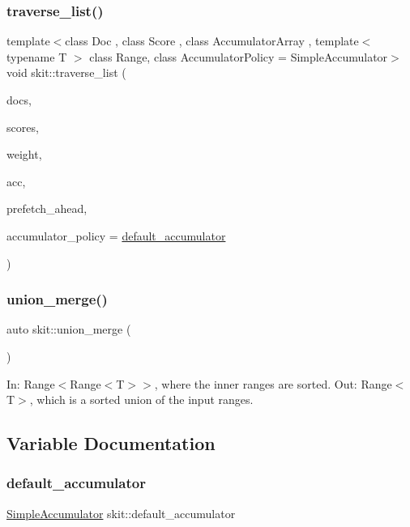 \mbox{\label{namespaceskit_aefabf6dd95494e20f6a58ad8b20e7bf9}} 
\subsubsection{\texorpdfstring{traverse\+\_\+list()}{traverse\_list()}\hspace{0.1cm}{\footnotesize\ttfamily [2/2]}}
{\footnotesize\ttfamily template$<$class Doc , class Score , class Accumulator\+Array , template$<$ typename T $>$ class Range, class Accumulator\+Policy  = Simple\+Accumulator$>$ \\
void skit\+::traverse\+\_\+list (\begin{DoxyParamCaption}\item[{const Range$<$ Doc $>$ \&}]{docs,  }\item[{const Range$<$ Score $>$ \&}]{scores,  }\item[{Score}]{weight,  }\item[{Accumulator\+Array \&}]{acc,  }\item[{unsigned int}]{prefetch\+\_\+ahead,  }\item[{Accumulator\+Policy \&}]{accumulator\+\_\+policy = {\ttfamily \hyperlink{namespaceskit_ae63f577a3ddf7bf051ff06113593330e}{default\+\_\+accumulator}} }\end{DoxyParamCaption})}

\mbox{\label{namespaceskit_a9a77a1f66da908b18436e900cf702ab3}} 
\subsubsection{\texorpdfstring{union\+\_\+merge()}{union\_merge()}}
{\footnotesize\ttfamily auto skit\+::union\+\_\+merge (\begin{DoxyParamCaption}{ }\end{DoxyParamCaption})}

In\+: Range$<$Range$<$\+T$>$$>$, where the inner ranges are sorted. Out\+: Range$<$\+T$>$, which is a sorted union of the input ranges. 

\subsection{Variable Documentation}
\mbox{\label{namespaceskit_ae63f577a3ddf7bf051ff06113593330e}} 
\subsubsection{\texorpdfstring{default\+\_\+accumulator}{default\_accumulator}}
{\footnotesize\ttfamily \hyperlink{classskit_1_1SimpleAccumulator}{Simple\+Accumulator} skit\+::default\+\_\+accumulator}

